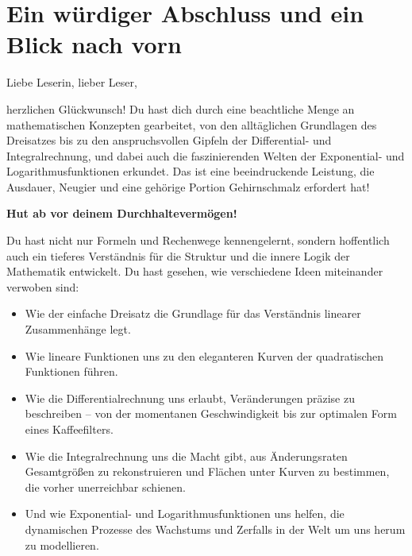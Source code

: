 \section{Ein würdiger Abschluss und ein Blick nach vorn}


Liebe Leserin, lieber Leser,

herzlichen Glückwunsch! Du hast dich durch eine beachtliche Menge an mathematischen Konzepten gearbeitet, von den alltäglichen Grundlagen des Dreisatzes bis zu den anspruchsvollen Gipfeln der Differential- und Integralrechnung, und dabei auch die faszinierenden Welten der Exponential- und Logarithmusfunktionen erkundet. Das ist eine beeindruckende Leistung, die Ausdauer, Neugier und eine gehörige Portion Gehirnschmalz erfordert hat!

\begin{center}
    \Large\bfseries Hut ab vor deinem Durchhaltevermögen!
\end{center}
\vspace{1em}

Du hast nicht nur Formeln und Rechenwege kennengelernt, sondern hoffentlich auch ein tieferes Verständnis für die Struktur und die innere Logik der Mathematik entwickelt. Du hast gesehen, wie verschiedene Ideen miteinander verwoben sind:
\begin{itemize}
    \item Wie der einfache Dreisatz die Grundlage für das Verständnis linearer Zusammenhänge legt.
    \item Wie lineare Funktionen uns zu den eleganteren Kurven der quadratischen Funktionen führen.
    \item Wie die Differentialrechnung uns erlaubt, Veränderungen präzise zu beschreiben – von der momentanen Geschwindigkeit bis zur optimalen Form eines Kaffeefilters.
    \item Wie die Integralrechnung uns die Macht gibt, aus Änderungsraten Gesamtgrößen zu rekonstruieren und Flächen unter Kurven zu bestimmen, die vorher unerreichbar schienen.
    \item Und wie Exponential- und Logarithmusfunktionen uns helfen, die dynamischen Prozesse des Wachstums und Zerfalls in der Welt um uns herum zu modellieren.
\end{itemize}

